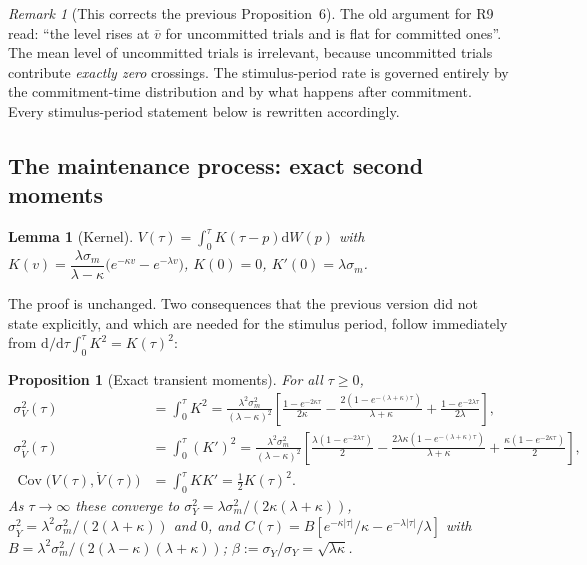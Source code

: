 \documentclass[11pt,a4paper]{article}
\newcommand{\Cov}{\operatorname{Cov}}
\newcommand{\dd}{\mathrm{d}}
\theoremstyle{plain}
\newtheorem{proposition}{Proposition}
\newtheorem{lemma}{Lemma}
\theoremstyle{remark}
\newtheorem{remark}{Remark}
\begin{document}
\begin{remark}[This corrects the previous Proposition~6]
The old argument for R9 read: ``the level rises at $\bar v$ for uncommitted trials and is
flat for committed ones''. The mean level of uncommitted trials is irrelevant, because
uncommitted trials contribute \emph{exactly zero} crossings. The stimulus-period rate is
governed entirely by the commitment-time distribution and by what happens after
commitment. Every stimulus-period statement below is rewritten accordingly.
\end{remark}

\subsection{The maintenance process: exact second moments}
\label{sec:cov}

\begin{lemma}[Kernel]
\label{lem:kernel}
$V(\tau)=\int_0^{\tau}K(\tau-p)\dd W(p)$ with
$K(v)=\dfrac{\lambda\sigma_m}{\lambda-\kappa}\bigl(e^{-\kappa v}-e^{-\lambda v}\bigr)$,
$K(0)=0$, $K'(0)=\lambda\sigma_m$.
\end{lemma}

The proof is unchanged. Two consequences that the previous version did not state
explicitly, and which are needed for the stimulus period, follow immediately from
$\dd/\dd\tau\int_0^\tau K^2=K(\tau)^2$:

\begin{proposition}[Exact transient moments]
\label{prop:transient}
For all $\tau\ge0$,
\begin{align}
\sigma_V^2(\tau)&=\int_0^\tau K^2
=\frac{\lambda^{2}\sigma_m^{2}}{(\lambda-\kappa)^{2}}
\left[\frac{1-e^{-2\kappa\tau}}{2\kappa}
-\frac{2(1-e^{-(\lambda+\kappa)\tau})}{\lambda+\kappa}
+\frac{1-e^{-2\lambda\tau}}{2\lambda}\right],\\
\sigma_{\dot V}^2(\tau)&=\int_0^\tau (K')^2
=\frac{\lambda^{2}\sigma_m^{2}}{(\lambda-\kappa)^{2}}
\left[\frac{\lambda(1-e^{-2\lambda\tau})}{2}
-\frac{2\lambda\kappa(1-e^{-(\lambda+\kappa)\tau})}{\lambda+\kappa}
+\frac{\kappa(1-e^{-2\kappa\tau})}{2}\right],\\
\Cov\bigl(V(\tau),\dot V(\tau)\bigr)&=\int_0^\tau KK'=\tfrac12 K(\tau)^2 .
\label{eq:covKK}
\end{align}
As $\tau\to\infty$ these converge to
$\sigma_Y^2=\lambda\sigma_m^2/(2\kappa(\lambda+\kappa))$,
$\sigma_{\dot Y}^2=\lambda^2\sigma_m^2/(2(\lambda+\kappa))$ and $0$, and
$C(\tau)=B[e^{-\kappa|\tau|}/\kappa-e^{-\lambda|\tau|}/\lambda]$ with
$B=\lambda^2\sigma_m^2/(2(\lambda-\kappa)(\lambda+\kappa))$;
$\beta:=\sigma_{\dot Y}/\sigma_Y=\sqrt{\lambda\kappa}$.
\end{proposition}
\end{document}
